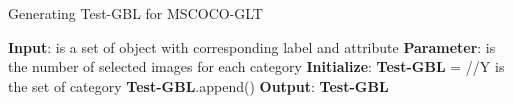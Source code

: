 \documentclass{article}
\begin{document}
\begin{algorithm}[H]
\caption{Generating Test-GBL for MSCOCO-GLT}
\label{alg:gbl}
\begin{algorithmic}
 \STATE \textbf{Input}:  is a set of object  with corresponding label  and attribute 
 \STATE \textbf{Parameter}:  is the number of selected images for each category
 \STATE \textbf{Initialize}: \textbf{Test-GBL} = 
    \STATE //Y is the set of category
        \STATE 
        \STATE 
        \WHILE{}
            \STATE 
            \STATE 
                \IF{}
                    \STATE 
                    \STATE 
                    \STATE 
                    \IF{}
                        \STATE 
                        \STATE 
                        \STATE 
                    \ENDIF
                \ENDIF
             \ENDFOR
        \STATE \textbf{Test-GBL}.append()
        \STATE 
        \STATE 
        \ENDWHILE
\ENDFOR
\STATE \textbf{Output}: \textbf{Test-GBL}
\end{algorithmic}
\end{algorithm}
\end{document}
